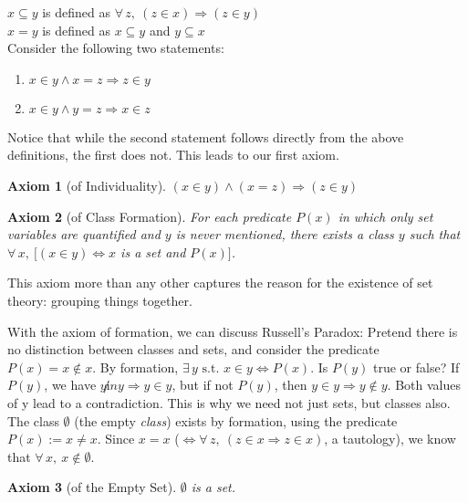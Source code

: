 \documentclass[12pt]{report}
\newcommand{\define}{  \noindent{\sc Definition }\hspace{5pt} }
\newcommand{\fall}{\forall\,}
\newcommand{\exst}{\exists\,}
\newcommand{\st}{\textrm{ s.t. }}
\newtheorem{axiom}{Axiom}
\begin{document}
\define $x \subseteq y$ is defined as $\fall z,\ (z \in x) \Rightarrow (z \in
y)$\\

\define $x = y$ is defined as $x \subseteq y$ and $y \subseteq x$\\

Consider the following two statements: 
\begin{enumerate}
\item $x \in y \land x = z \Rightarrow z \in y$
\item $x \in y \land y = z \Rightarrow x \in z$
\end{enumerate}

Notice that while the second statement follows directly from the above
definitions, the first does not. This leads to our first axiom.

\begin{axiom}[of Individuality]
$(x \in y) \land (x = z) \Rightarrow (z \in y)$
\end{axiom}

\begin{axiom}[of Class Formation]
For each predicate $P(x)$ in which only set variables are quantified and $y$
is never mentioned, there exists a class $y$ such that $\fall x,\ [(x \in y)
\iff x$ is a set and $P(x)]$.
\end{axiom}

This axiom more than any other captures the reason for the existence of set
theory: grouping things together.

With the axiom of formation, we can discuss Russell's Paradox: Pretend there
is no distinction between classes and sets, and consider the
predicate $P(x) = x \not \in x$. By formation, $\exst y \st x \in y \iff
P(x)$. Is $P(y)$ true or false? If $P(y)$, we have  
$y \not in y \Rightarrow y \in y$,
but if not $P(y)$, then $y \in y \Rightarrow y \not \in y$. Both values of y
lead to a contradiction. This is why we need not just sets, but classes
also.\\

The class $\emptyset$ (the empty {\em class}) exists by formation, using the
predicate $P(x) := x \neq x$. Since $x = x$ ($\iff \fall z,\ (z \in x
\Rightarrow z \in x)$, a tautology), we know that $\fall x,\ x \not \in
\emptyset$.

\index{$\emptyset$}
\begin{axiom}[of the Empty Set]
$\emptyset$ is a set.
\end{axiom}
\end{document}

